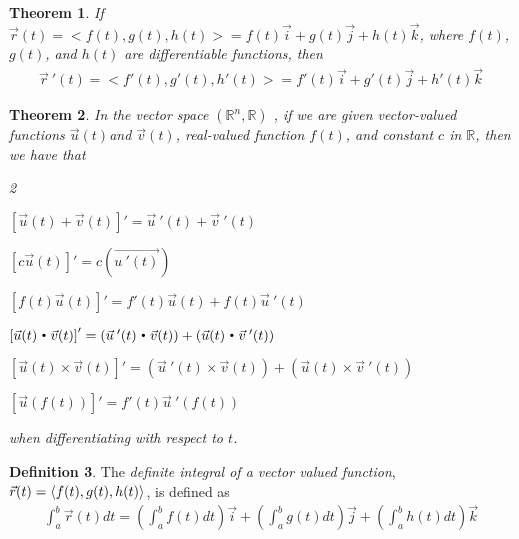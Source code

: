 \documentclass{article}[11pt]
\newtheorem{theorem}{Theorem}[section]
\theoremstyle{definition}
\newtheorem{definition}[theorem]{Definition}
\DeclareMathOperator*{\dotprod}{\scalerel*{\cdot}{\bigodot}}
\DeclarePairedDelimiter\vecvec{\langle}{\rangle}
\numberwithin{equation}{section}
\begin{document}
\begin{theorem}\label{thm: derivative is derivative of components}
	If \(\vec{r}(t)=<f(t),g(t),h(t)>=f(t)\vec{i}+g(t)\vec{j}+h(t)\vec{k}\), where \(f(t)\), \(g(t)\), and \(h(t)\) are differentiable functions, then
	\begin{align*}
	\vec{r}\:'(t)=<f'(t),g'(t),h'(t)>=f'(t)\vec{i}+g'(t)\vec{j}+h'(t)\vec{k}
	\end{align*}
\end{theorem}

\noindent
\begin{minipage}{\textwidth}
	\begin{theorem}
	In the vector space \((\mathbb{R}^n,\mathbb{R})\) , if we are given vector-valued functions  \(\vec{u}(t)\)and \(\vec{v}(t)\), real-valued function \(f(t)\), and constant \(c\) in \(\mathbb{R}\), then we have that
	\begin{enumerate}[1.]
	\end{enumerate}
	when differentiating with respect to \(t\).
\end{theorem}

\end{minipage}
\begin{definition}
	The \emph{definite integral of a vector valued function}, \(\vec{r}(t)=\vecvec{f(t),g(t),h(t)}\), is defined as
	\begin{align}
	\int_{a}^{b} \vec{r}(t)dt=
	\left( \int_{a}^{b} f(t) dt \right)\vec{i}
	+
	\left( \int_{a}^{b} g(t) dt \right)\vec{j}
	+
	\left( \int_{a}^{b} h(t) dt \right)\vec{k}
	\end{align}
\end{definition}
\end{document}
